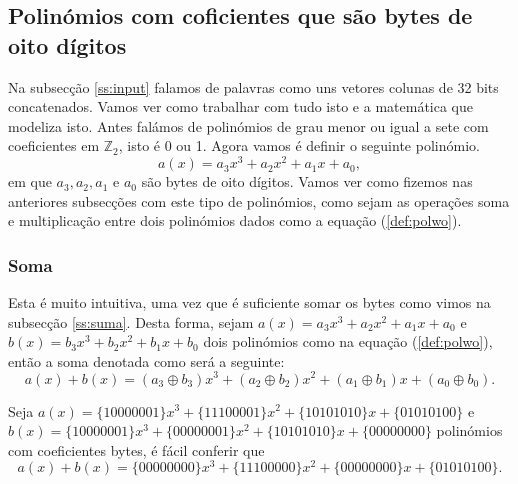 
\subsection{Polinómios com coficientes que são bytes de oito dígitos}

Na subsecção \ref{ss:input} falamos de palavras como uns vetores colunas de 32 bits concatenados. Vamos ver como trabalhar com tudo isto e a matemática que modeliza isto. Antes falámos de polinómios de grau menor ou igual a sete com coeficientes em $\mathbb{Z}_2$, isto é 0 ou 1. Agora vamos é definir o seguinte polinómio.
\begin{equation}\label{def:polwo}
a(x)=a_3 x^3+a_2 x^2+ a_1 x + a_0,
\end{equation}
em que $a_3,a_2,a_1$ e $a_0$ são bytes de oito dígitos. Vamos ver como fizemos nas anteriores subsecções com este tipo de polinómios, como sejam as operações soma e multiplicação entre dois polinómios dados como a equação (\ref{def:polwo}).
\subsubsection{Soma}\label{ss:sumarara}
Esta é muito intuitiva, uma vez que é suficiente somar os bytes como vimos na subsecção \ref{ss:suma}. Desta forma, sejam $a(x)=a_3 x^3+a_2 x^2+ a_1 x + a_0$ e $b(x)=b_3 x^3+b_2 x^2+ b_1 x + b_0$ dois polinómios como na equação  (\ref{def:polwo}), então a soma denotada como será a seguinte:
$$
a(x)+b(x)=(a_3 \oplus b_3) x^3+(a_2 \oplus b_2) x^2+ (a_1 \oplus b_1) x + (a_0 \oplus b_0).
$$
\begin{example}
Seja $a(x)=\{10000001\} x^3+\{11100001\} x^2+ \{10101010\} x +\{01010100\}$ e $b(x)=\{10000001\} x^3+\{00000001\} x^2+ \{10101010\} x +\{00000000\}$ polinómios com coeficientes bytes, é fácil conferir que 
$$
a(x)+b(x)=\{00000000\} x^3+\{11100000\} x^2+ \{00000000\} x +\{01010100\}.
$$
\end{example}
